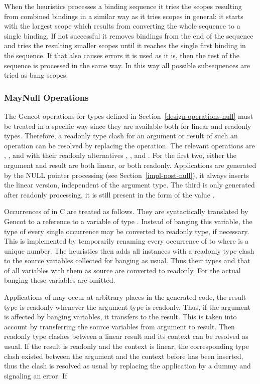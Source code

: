 When the heuristics processes a binding sequence it tries the scopes resulting from combined bindings in a similar way as it
tries scopes in general: it starts with the largest scope which results from converting the whole sequence to a single binding.
If not successful it removes bindings from the end of the sequence and tries the resulting smaller scopes until it reaches the
single first binding in the sequence. If that also causes errors it is used as it is, then the rest of the sequence is processed
in the same way. In this way all possible subsequences are tried as bang scopes.

\subsubsection{MayNull Operations}

The Gencot operations for  types defined in Section~\ref{design-operations-null} must be treated in a specific
way since they are available both for linear and readonly types. Therefore, a readonly type clash for an argument or result
of such an operation can be resolved by replacing the operation. The relevant operations are , ,
and  with their readonly alternatives , , and . For the first two,
either the argument and result are both linear, or both readonly. Applications are generated by the NULL pointer processing
(see Section~\ref{impl-post-null}), it always inserts the linear version, independent of the argument type. The third is only
generated after readonly processing, it is still present in the form of the value .

Occurrences of  in C are treated as follows. They are syntactically translated by Gencot to a reference to a
variable  of type . Instead of banging this variable, the type of every single
occurrence may be converted to readonly type, if necessary. This is implemented by temporarily renaming every occurrence of
 to  where  is a unique number. The heuristics then adds all instances
with a readonly type clash to the source variables collected for banging as usual. Thus their types and that of all variables
with them as source are converted to readonly. For the actual banging these variables are omitted.

Applications of  may occur at arbitrary places in the generated code, the result type is readonly whenever the
argument type is readonly. Thus, if the argument is affected by banging variables, it transfers to the result. This is taken
into account by transferring the source variables from argument to result. Then readonly type clashes between a linear result
and its context can be resolved as usual. If the result is readonly and the context is linear, the corresponding type clash
existed between the argument and the context before  has been inserted, thus the clash is resolved as usual
by replacing the  application by a dummy and signaling an error. If


